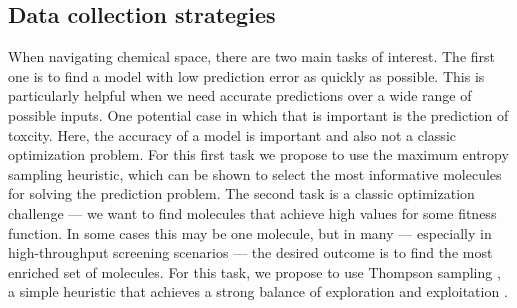 \subsection{Data collection strategies}

When navigating chemical space, there are two main tasks of interest.  The first one is to find a model with low prediction error as quickly as possible.
This is particularly helpful when we need accurate predictions over a wide range of possible inputs. One potential case in which that is important is the prediction of toxcity.  Here, the accuracy of a model is important and  also not a classic optimization problem. For this first task we propose to use the maximum entropy sampling heuristic, which can be shown to select the most informative molecules for solving
the prediction problem.  The second task is a classic optimization challenge --- we want to find molecules that achieve high values for some fitness
function.  In some cases this may be one molecule, but in many --- especially in high-throughput screening scenarios \cite{pyzer-knapp_what_2015} --- the
desired outcome is to find the most enriched set of molecules. For this task, we propose to use Thompson sampling \cite{thompson_likelihood_1933}, a simple
heuristic that achieves a strong balance of exploration and exploitation \cite{Chapelle2011}.